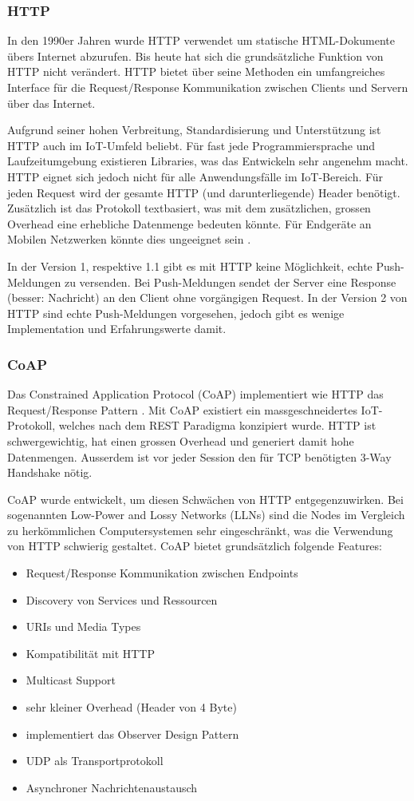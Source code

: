 \subsubsection{HTTP}
In den 1990er Jahren wurde HTTP verwendet um statische HTML-Dokumente übers Internet abzurufen. Bis heute hat sich die grundsätzliche Funktion von HTTP nicht verändert. HTTP bietet über seine Methoden ein umfangreiches Interface für die Request/Response Kommunikation zwischen Clients und Servern über das Internet. 

Aufgrund seiner hohen Verbreitung, Standardisierung und Unterstützung ist HTTP auch im IoT-Umfeld beliebt. Für fast jede Programmiersprache und Laufzeitumgebung existieren Libraries, was das Entwickeln sehr angenehm macht. HTTP eignet sich jedoch nicht für alle Anwendungsfälle im IoT-Bereich. Für jeden Request wird der gesamte HTTP (und darunterliegende) Header benötigt. Zusätzlich ist das Protokoll textbasiert, was mit dem zusätzlichen, grossen Overhead eine erhebliche Datenmenge bedeuten könnte. Für Endgeräte an Mobilen Netzwerken könnte dies ungeeignet sein \cite{Obermaier15}.

In der Version 1, respektive 1.1 gibt es mit HTTP keine Möglichkeit, echte Push-Meldungen zu versenden. Bei Push-Meldungen sendet der Server eine Response (besser: Nachricht) an den Client ohne vorgängigen Request. In der Version 2 von HTTP sind echte Push-Meldungen vorgesehen, jedoch gibt es wenige Implementation und Erfahrungswerte damit.
\newpage
\subsubsection{CoAP}
\label{sec:iotkomm}
Das Constrained Application Protocol (CoAP) implementiert wie HTTP das Request/Response Pattern \cite{Obermaier15}. Mit CoAP existiert ein massgeschneidertes IoT-Protokoll, welches nach dem REST Paradigma konzipiert wurde. HTTP ist schwergewichtig, hat einen grossen Overhead und generiert damit hohe Datenmengen. Ausserdem ist vor jeder Session den für TCP benötigten 3-Way Handshake nötig. 
 
CoAP wurde entwickelt, um diesen Schwächen von HTTP entgegenzuwirken. Bei sogenannten Low-Power and Lossy Networks (LLNs) sind die Nodes im Vergleich zu herkömmlichen Computersystemen sehr eingeschränkt, was die Verwendung von HTTP schwierig gestaltet. CoAP bietet grundsätzlich folgende Features:\cite{RFC7252}
\begin{itemize}
\item Request/Response Kommunikation zwischen Endpoints	
\item Discovery von Services und Ressourcen
\item URIs und Media Types
\item Kompatibilität mit HTTP
\item Multicast Support
\item sehr kleiner Overhead (Header von 4 Byte)
\item implementiert das Observer Design Pattern
\item UDP als Transportprotokoll
\item Asynchroner Nachrichtenaustausch
\end{itemize}
 

